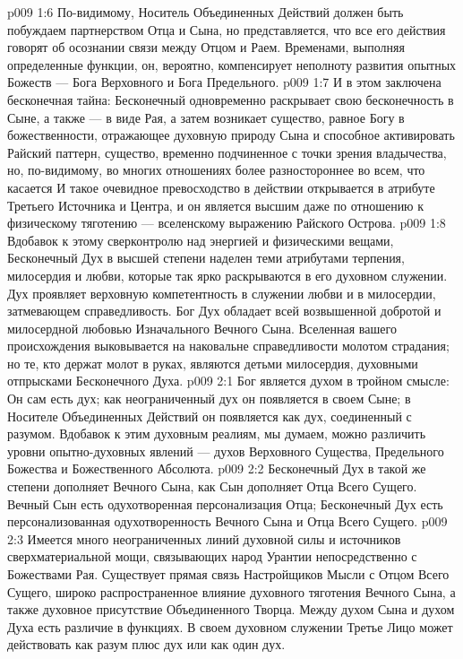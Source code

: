 \vs p009 1:6 По\hyp{}видимому, Носитель Объединенных Действий должен быть побуждаем партнерством Отца и Сына, но представляется, что все его действия говорят об осознании связи между Отцом и Раем. Временами, выполняя определенные функции, он, вероятно, компенсирует неполноту развития опытных Божеств --- Бога Верховного и Бога Предельного.
\vs p009 1:7 \pc И в этом заключена бесконечная тайна: Бесконечный одновременно раскрывает свою бесконечность в Сыне, а также --- в виде Рая, а затем возникает существо, равное Богу в божественности, отражающее духовную природу Сына и способное активировать Райский паттерн, существо, временно подчиненное с точки зрения владычества, но, по\hyp{}видимому, во многих отношениях более разностороннее во всем, что касается  И такое очевидное превосходство в действии открывается в атрибуте Третьего Источника и Центра, и он является высшим даже по отношению к физическому тяготению --- вселенскому выражению Райского Острова.
\vs p009 1:8 Вдобавок к этому сверконтролю над энергией и физическими вещами, Бесконечный Дух в высшей степени наделен теми атрибутами терпения, милосердия и любви, которые так ярко раскрываются в его духовном служении. Дух проявляет верховную компетентность в служении любви и в милосердии, затмевающем справедливость. Бог Дух обладает всей возвышенной добротой и милосердной любовью Изначального Вечного Сына. Вселенная вашего происхождения выковывается на наковальне справедливости молотом страдания; но те, кто держат молот в руках, являются детьми милосердия, духовными отпрысками Бесконечного Духа.
\vs p009 2:1 Бог является духом в тройном смысле: Он сам есть дух; как неограниченный дух он появляется в своем Сыне; в Носителе Объединенных Действий он появляется как дух, соединенный с разумом. Вдобавок к этим духовным реалиям, мы думаем, можно различить уровни опытно\hyp{}духовных явлений --- духов Верховного Существа, Предельного Божества и Божественного Абсолюта.
\vs p009 2:2 Бесконечный Дух в такой же степени дополняет Вечного Сына, как Сын дополняет Отца Всего Сущего. Вечный Сын есть одухотворенная персонализация Отца; Бесконечный Дух есть персонализованная одухотворенность Вечного Сына и Отца Всего Сущего.
\vs p009 2:3 Имеется много неограниченных линий духовной силы и источников сверхматериальной мощи, связывающих народ Урантии непосредственно с Божествами Рая. Существует прямая связь Настройщиков Мысли с Отцом Всего Сущего, широко распространенное влияние духовного тяготения Вечного Сына, а также духовное присутствие Объединенного Творца. Между духом Сына и духом Духа есть различие в функциях. В своем духовном служении Третье Лицо может действовать как разум плюс дух или как один дух.
